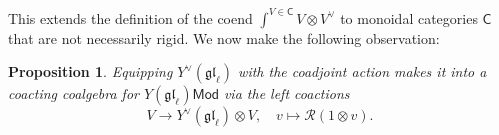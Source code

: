 \documentclass[11pt]{report}
\newtheorem{prop}[theorem]{Proposition}
\theoremstyle{definition}
\newtheorem{definition}[theorem]{Definition}
\theoremstyle{remark}
\theoremstyle{remark}
\newcommand{\Hom}{\operatorname{Hom}}
\newcommand{\C}{\mathbb{C}}
\begin{document}
This extends the definition of the coend $\int^{V \in \mathsf{C}} V \otimes V^\vee$ to monoidal categories $\mathsf{C}$ that are not necessarily rigid. We now make the following observation:

%
%

\begin{prop}
Equipping $Y^\vee(\mathfrak{gl}_\ell)$ with the coadjoint action makes it into a coacting coalgebra for $Y(\mathfrak{gl}_\ell)\mathsf{Mod}$ via the left coactions
\begin{equation*}
V \to Y^\vee(\mathfrak{gl}_\ell) \otimes V, \quad v \mapsto \mathcal{R} (1 \otimes v).
\end{equation*}
\end{prop}
\end{document}
